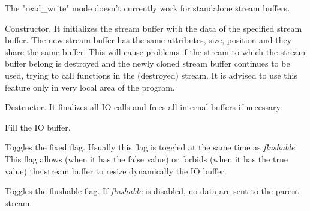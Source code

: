 
The "read\_write" mode doesn't currently work for standalone stream buffers.


Constructor. It initializes the stream buffer with the data of the specified
stream buffer. The new stream buffer has the same attributes, size, position
and they share the same buffer. This will cause problems if the stream to
which the stream buffer belong is destroyed and the newly cloned stream
buffer continues to be used, trying to call functions in the (destroyed)
stream. It is advised to use this feature only in very local area of the
program.




\label{wxstreambufferdtor}


Destructor. It finalizes all IO calls and frees all internal buffers if
necessary.


\label{wxstreambufferfillbuffer}


Fill the IO buffer.


\label{wxstreambufferfixed}


Toggles the fixed flag. Usually this flag is toggled at the same time as 
{\it flushable}. This flag allows (when it has the false value) or forbids
(when it has the true value) the stream buffer to resize dynamically the IO buffer.




\label{wxstreambufferflushable}


Toggles the flushable flag. If {\it flushable} is disabled, no data are sent
to the parent stream.


\label{wxstreambufferflushbuffer}

